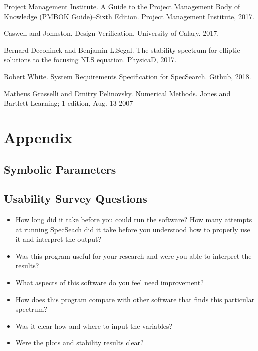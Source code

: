 \documentclass[12pt, titlepage]{article}
\begin{document}


\newpage 
\begin{thebibliography}{9} 
	Project Management Institute. 
	A Guide to the Project Management Body of Knowledge (PMBOK Guide)–Sixth 
	Edition. 
	Project Management Institute, 2017. 
	
	Caswell and Johnston. 
	Design Verification. 
	University of Calary. 2017. 
	
	Bernard Deconinck and Benjamin L.Segal. 
	The stability spectrum for elliptic solutions to the focusing NLS equation. 
	PhysicaD, 2017. 
	 
	Robert White. 
	System Requirements Specification for SpecSearch. 
	Github, 2018. 
	
	Matheus Grasselli and Dmitry Pelinovsky. 
	Numerical Methods. 
	Jones and Bartlett Learning; 1 edition, Aug. 13 2007
	
\end{thebibliography} 

\newpage

\section{Appendix}

\subsection{Symbolic Parameters}
\label{SymbolicParameters} 
\subsection{Usability Survey Questions}
\label{UsabilitySurvey}
\begin{itemize}
	\item How long did it take before you could run the software? How many 
	attempts at running SpecSeach  did it take before you understood how to 
	properly use it and interpret the output?
	\item Was this program useful for your research and were you able to 
	interpret the results? 
	\item What aspects of this software do you feel need improvement?
	\item How does this program compare with other software that finds this 
	particular spectrum? 
	\item Was it clear how and where to input the variables? 
	\item Were the plots and stability results clear? 
\end{itemize} 
\end{document}
